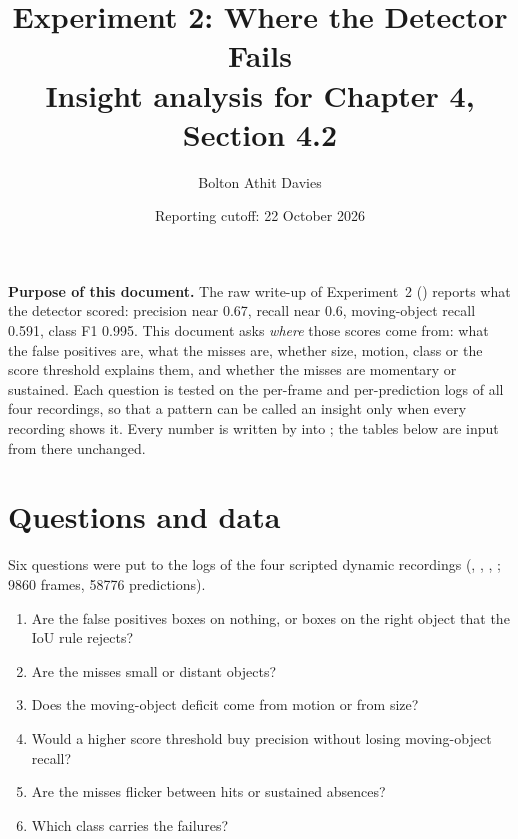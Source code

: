 \documentclass[11pt,a4paper,notitlepage]{report}
\title{Experiment 2: Where the Detector Fails\\
       \large Insight analysis for Chapter 4, Section 4.2}
\author{Bolton Athit Davies}
\date{Reporting cutoff: 22 October 2026}
\begin{document}
\maketitle

\noindent\textbf{Purpose of this document.} The raw write-up of Experiment~2
() reports what the detector scored: precision
near \num{0.67}, recall near \num{0.6}, moving-object recall \num{0.591}, class
F1 \num{0.995}. This document asks \emph{where} those scores come from: what
the false positives are, what the misses are, whether size, motion, class or
the score threshold explains them, and whether the misses are momentary or
sustained. Each question is tested on the per-frame and per-prediction logs
of all four recordings, so that a pattern can be called an insight only when
every recording shows it. Every number is written by
 into
; the tables below are input
from there unchanged.

\section{Questions and data}

Six questions were put to the logs of the four scripted dynamic recordings
(, , , ;
\num{9860} frames, \num{58776} predictions).

\begin{enumerate}[label=Q\arabic*.]
\item Are the false positives boxes on nothing, or boxes on the right object
      that the IoU rule rejects?
\item Are the misses small or distant objects?
\item Does the moving-object deficit come from motion or from size?
\item Would a higher score threshold buy precision without losing
      moving-object recall?
\item Are the misses flicker between hits or sustained absences?
\item Which class carries the failures?
\end{enumerate}
\end{document}
